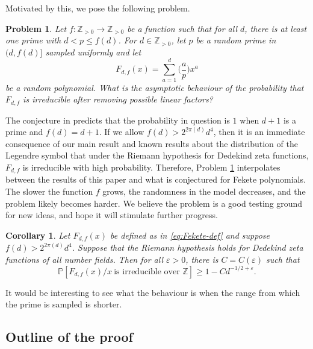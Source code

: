 \documentclass[12pt, notitlepage]{amsart}
\numberwithin{equation}{section}
\def\Z{\mathbb Z}
\def\P{\mathbb P}
\newtheorem{corollary}[theorem]{Corollary}
\newtheorem{problem}[theorem]{Problem}
\theoremstyle{remark}
\theoremstyle{definition}
\theoremstyle{remark}
\numberwithin{equation}{section}
\newcommand{\e}{\varepsilon}
\begin{document}
Motivated by this, we pose the following problem.
\begin{problem}\label{prb:Fekete}
Let $f:\Z_{>0}\to \Z_{>0}$ be a function such that for all $d$, there is at least
one prime with $d<p\le f(d)$.
For $d\in\Z_{>0}$, let $p$ be a random prime in $(d,f(d)]$ sampled uniformly
and let
\begin{equation}\label{eq:Fekete-def}
F_{d,f}(x)= \sum_{a=1}^{d} \Big(\frac{a}{p}\Big) x^a
\end{equation}
be a random polynomial.
What is the asymptotic behaviour of the probability that $F_{d,f}$ is irreducible
after removing possible linear factors?
\end{problem}

The conjecture in \cite{MNT23} predicts that the probability in question is
$1$ when $d+1$ is a prime and $f(d)=d+1$.
If we allow $f(d)>2^{2\pi(d)}d^4$, then it is an immediate consequence of our
main result and known results about the distribution of the  Legendre symbol
that under the Riemann hypothesis for Dedekind zeta functions,
$F_{d,f}$ is irreducible with high probability.
Therefore, Problem \ref{prb:Fekete} interpolates between the results
of this paper and what is conjectured for Fekete polynomials.
The slower the function $f$ grows, the randomness in the model decreases, and the problem
likely becomes harder.
We believe the problem is a good testing ground for new ideas, and hope it will stimulate
further progress.


\begin{corollary}\label{cr:pd}
	Let $F_{d, f}(x)$ be defined as in \eqref{eq:Fekete-def}
	and suppose $f(d)>2^{2\pi(d)}d^4$.
	Suppose that the Riemann hypothesis holds for Dedekind zeta functions
	of all number fields.
	Then for all $\e>0$, there is $C=C(\e)$ such that
	\[
	\P[{F_{d,f}(x)/x}~\text{is irreducible over $\Z$}]
	\ge 1 - C d^{-1/2+\e}.
	\]
\end{corollary}

It would be interesting to see what the behaviour is when the range from which
the prime is sampled is shorter.

\subsection{Outline of the proof}
\end{document}
